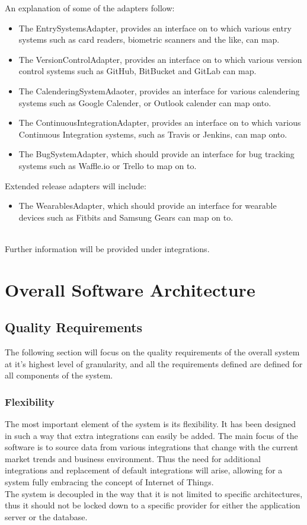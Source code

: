\documentclass[11pt,a4paper]{article}
\begin{document}
An explanation of some of the adapters follow:
\begin{itemize}
	\item The EntrySystemsAdapter, provides an interface on to which various entry systems such as card readers, biometric scanners and the like, can map.
	\item The VersionControlAdapter, provides an interface on to which various version control systems such as GitHub, BitBucket and GitLab can map.
	\item The CalenderingSystemAdaoter, provides an interface for various calendering systems such as Google Calender, or Outlook calender can map onto.
	\item The ContinuousIntegrationAdapter, provides an interface on to which various Continuous Integration systems, such as Travis or Jenkins, can map onto.
	\item The BugSystemAdapter, which should provide an interface for bug tracking systems such as Waffle.io or Trello to map on to.\\
\end{itemize}
Extended release adapters will include:
\begin{itemize}
	\item The WearablesAdapter, which should provide an interface for wearable devices such as Fitbits and Samsung Gears can map on to.\\\\ 
\end{itemize}
Further information will be provided under integrations.

\section{Overall Software Architecture}

\subsection{Quality Requirements}
The following section will focus on the quality requirements of the overall system at it's highest level of granularity, and all the requirements defined are defined for all components of the system.

\subsubsection{Flexibility}
The most important element of the system is its flexibility. It has been designed in such a way that extra integrations can easily be added. The main focus of the software is to source data from various integrations that change with the current market trends and business environment. Thus the need for additional integrations and replacement of default integrations will arise, allowing for a system fully embracing the concept of Internet of Things.\\
The system is decoupled in the way that it is not limited to specific architectures, thus it should not be locked down to a specific provider for either the application server or the database.
\end{document}
